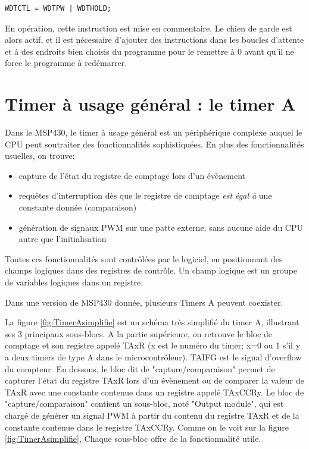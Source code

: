\lstset{style=customc}
\begin{lstlisting}
WDTCTL = WDTPW | WDTHOLD;
\end{lstlisting}
En opération, cette instruction est mise en commentaire. Le chien de garde est alors actif, et il est nécessaire d'ajouter des instructions dans les boucles d'attente et à des endroits bien choisis du programme pour le remettre à 0 avant qu'il ne force le programme à redémarrer.

\section{Timer à usage général : le timer A}
Dans le MSP430, le timer à usage général est un périphérique complexe auquel le CPU peut soutraiter des fonctionnalités sophistiquées. En plus des fonctionnalités usuelles, on trouve:
\begin{itemize}[label=\textbullet,font=\small]
\item capture de l'état du registre de comptage lors d'un évènement
\item requêtes d'interruption dès que le registre de comptage \textit{est égal à} une constante donnée (comparaison)
\item génération de signaux PWM sur une patte externe, sans aucune aide du CPU autre que l'initialisation
\end{itemize}
Toutes ces fonctionnalités sont contrôlées par le logiciel, en positionnant des champs logiques dans des registres de contrôle. Un champ logique est un groupe de variables logiques dans un registre.

Dans une version de MSP430 donnée, plusieurs Timers A peuvent coexister.

La figure \ref{fig:TimerAsimplifie} est un schéma très simplifié du timer A, illustrant ses 3 principaux sous-blocs. A la partie supérieure, on retrouve le bloc de comptage et son registre appelé TAxR (x est le numéro du timer; x=0 ou 1 s'il y a deux timers de type A dans le microcontrôleur). TAIFG est le signal d'overflow du compteur. En dessous, le bloc dit de "capture/comparaison" permet de capturer l'état du registre TAxR lors d'un évènement ou de comparer la valeur de TAxR avec une constante contenue dans un registre appelé TAxCCRy. Le bloc de "capture/comparaison" contient un sous-bloc, noté "Output module", qui est chargé de générer un signal PWM à partir du contenu du registre TAxR et de la constante contenue dans le registre TAxCCRy.
Comme on le voit sur la figure \ref{fig:TimerAsimplifie}, Chaque sous-bloc offre de la fonctionnalité utile.

